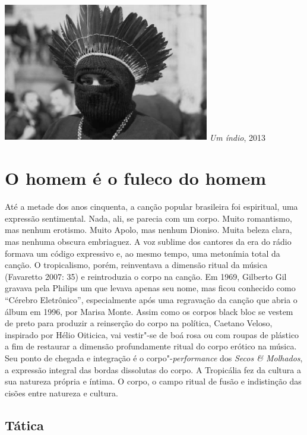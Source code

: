 \begin{center}
\includegraphics[width=9cm,height=6.1cm]{Imgs/img9.jpg}
\emph{Um índio}, 2013
\end{center}

\section{O homem é o fuleco do homem}

Até a metade dos anos cinquenta, a canção popular brasileira foi
espiritual, uma expressão sentimental. Nada, ali, se parecia com um
corpo. Muito romantismo, mas nenhum erotismo. Muito Apolo, mas nenhum
Dioniso. Muita beleza clara, mas nenhuma obscura embriaguez. A voz
sublime dos cantores da era do rádio formava um código expressivo e, ao
mesmo tempo, uma metonímia total da canção. O tropicalismo, porém,
reinventava a dimensão ritual da música (Favaretto 2007: 35) e
reintroduzia o corpo na canção. Em 1969, Gilberto Gil gravava pela
Philips um  que levava apenas seu nome, mas ficou conhecido como
``Cérebro Eletrônico'', especialmente após uma regravação da canção que
abria o álbum em 1996, por Marisa Monte. Assim como os corpos black bloc
se vestem de preto para produzir a reinserção do corpo na política,
Caetano Veloso, inspirado por Hélio Oiticica, vai vestir"-se de boá rosa
ou com roupas de plástico a fim de restaurar a dimensão profundamente
ritual do corpo erótico na música. Seu ponto de chegada e integração é o
corpo"-\emph{performance} dos \emph{Secos \& Molhados}, a expressão
integral das bordas dissolutas do corpo. A Tropicália fez da cultura a
sua natureza própria e íntima. O corpo, o campo ritual de fusão e
indistinção das cisões entre natureza e cultura.

 

\subsection{Tática}

